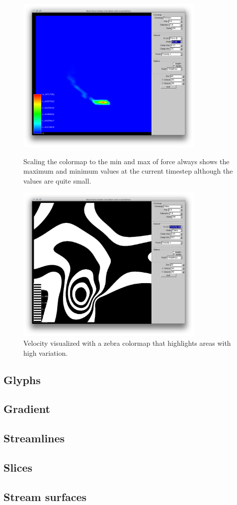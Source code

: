 \begin{figure}[htbp]
\centering
\begin{minipage}[t]{0.48\textwidth}
        \includegraphics[height=3in]{figures/colormaps/forceScaled.png}
\caption{Scaling the colormap to the min and max of force always shows the maximum and minimum values at the current timestep although the values are quite small.}
\label{fig:forceScaled}
\end{minipage}\hspace{.04\textwidth}%
\begin{minipage}[t]{0.48\textwidth}
        \includegraphics[height=3in]{figures/colormaps/velocityZebra.png}
    \caption{Velocity visualized with a zebra colormap that highlights areas with high variation.}
    \label{fig:velocityZebra}
\end{minipage}
\end{figure}


\subsection{Glyphs}
\subsection{Gradient}
\subsection{Streamlines}
\subsection{Slices}
\subsection{Stream surfaces}